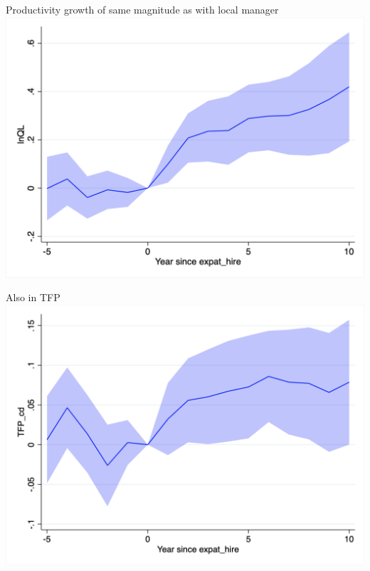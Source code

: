 \documentclass[
  ignorenonframetext,
  aspectratio=43,
]{beamer}
\begin{document}
\begin{frame}{Productivity growth of same magnitude as with local
manager}
\protect\hypertarget{productivity-growth-of-same-magnitude-as-with-local-manager}{}
\includegraphics{figure/event_study/expat_hire_lnQL.png}
\end{frame}

\begin{frame}{Also in TFP}
\protect\hypertarget{also-in-tfp-1}{}
\includegraphics{figure/event_study/expat_hire_TFP_cd.png}
\end{frame}
\end{document}
